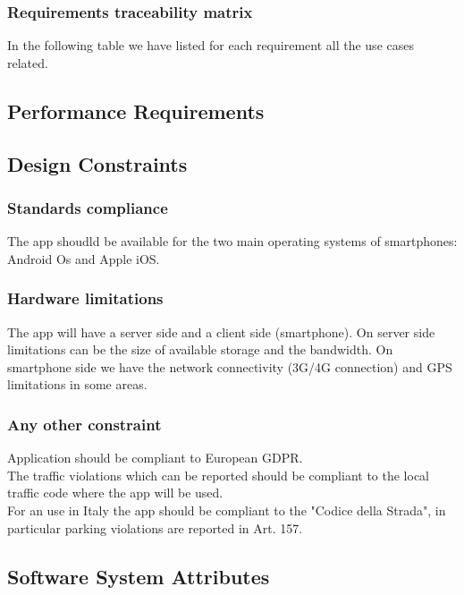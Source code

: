 \subsubsection{Requirements traceability matrix}
In the following table we have listed for each requirement all the use cases related.




\subsection{Performance Requirements}

\subsection{Design Constraints}%

\subsubsection{Standards compliance}
The app shoudld be available for the two main operating systems of smartphones: Android Os and Apple iOS.\\



\subsubsection{Hardware limitations}
The app will have a server side and a client side (smartphone).
On server side limitations can be the size of available storage and the bandwidth.
On smartphone side we have the network connectivity (3G/4G connection) and GPS limitations in some areas.

\subsubsection{Any other constraint}
Application should be compliant to European GDPR.\\
The traffic violations which can be reported should be compliant to the local traffic code where the app will be used.\\
For an use in Italy the app should be compliant to the "Codice della Strada", in particular parking violations are reported in Art. 157.\\

\subsection{Software System Attributes}
